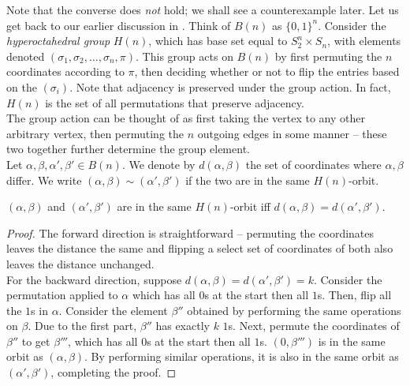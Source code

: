 	Note that the converse does \emph{not} hold; we shall see a counterexample later. Let us get back to our earlier discussion in . Think of $B(n)$ as $\{0,1\}^n$. Consider the \emph{hyperoctahedral group} $H(n)$, which has base set equal to $S_2^n \times S_n$, with elements denoted $(\sigma_1,\sigma_2,\ldots,\sigma_n,\pi)$. This group acts on $B(n)$ by first permuting the $n$ coordinates according to $\pi$, then deciding whether or not to flip the entries based on the $(\sigma_i)$. Note that adjacency is preserved under the group action. In fact, $H(n)$ is the set of all permutations that preserve adjacency.\\
	The group action can be thought of as first taking the vertex to any other arbitrary vertex, then permuting the $n$ outgoing edges in some manner -- these two together further determine the group element.\\

	Let $\alpha,\beta,\alpha',\beta' \in B(n)$. We denote by $d(\alpha,\beta)$ the set of coordinates where $\alpha,\beta$ differ. We write $(\alpha,\beta) \sim (\alpha',\beta')$ if the two are in the same $H(n)$-orbit.

	\begin{flem}
		$(\alpha,\beta)$ and $(\alpha',\beta')$ are in the same $H(n)$-orbit iff $d(\alpha,\beta) = d(\alpha',\beta')$.
	\end{flem}
	\begin{proof}
		The forward direction is straightforward -- permuting the coordinates leaves the distance the same and flipping a select set of coordinates of both also leaves the distance unchanged.\\
		For the backward direction, suppose $d(\alpha,\beta) = d(\alpha',\beta') = k$. Consider the permutation applied to $\alpha$ which has all $0$s at the start then all $1$s. Then, flip all the $1$s in $\alpha$. Consider the element $\beta''$ obtained by performing the same operations on $\beta$. Due to the first part, $\beta''$ has exactly $k$ $1$s. Next, permute the coordinates of $\beta''$ to get $\beta'''$, which has all $0$s at the start then all $1$s. $(0,\beta''')$ is in the same orbit as $(\alpha,\beta)$. By performing similar operations, it is also in the same orbit as $(\alpha',\beta')$, completing the proof. 
	\end{proof}

